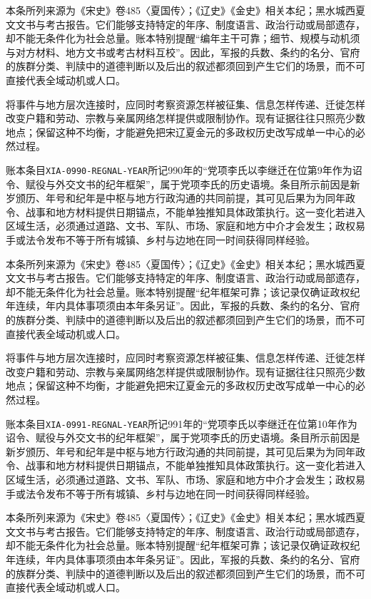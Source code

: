 本条所列来源为《宋史》卷485〈夏国传〉；《辽史》《金史》相关本纪；黑水城西夏文文书与考古报告。它们能够支持特定的年序、制度语言、政治行动或局部遗存，却不能无条件化为社会总量。账本特别提醒“编年主干可靠；细节、规模与动机须与对方材料、地方文书或考古材料互校”。因此，军报的兵数、条约的名分、官府的族群分类、判牍中的道德判断以及后出的叙述都须回到产生它们的场景，而不可直接代表全域动机或人口。

将事件与地方层次连接时，应同时考察资源怎样被征集、信息怎样传递、迁徙怎样改变户籍和劳动、宗教与亲属网络怎样提供或限制协作。现有证据往往只照亮少数地点；保留这种不均衡，才能避免把宋辽夏金元的多政权历史改写成单一中心的必然过程。

账本条目\texttt{XIA-0990-REGNAL-YEAR}所记990年的“党项李氏以李继迁在位第9年作为诏令、赋役与外交文书的纪年框架”，属于党项李氏的历史语境。条目所示前因是新岁颁历、年号和纪年是中枢与地方行政沟通的共同前提，其可见后果为为同年政令、战事和地方材料提供日期锚点，不能单独推知具体政策执行。这一变化若进入区域生活，必须通过道路、文书、军队、市场、家庭和地方中介才会发生；政权易手或法令发布不等于所有城镇、乡村与边地在同一时间获得同样经验。

本条所列来源为《宋史》卷485〈夏国传〉；《辽史》《金史》相关本纪；黑水城西夏文文书与考古报告。它们能够支持特定的年序、制度语言、政治行动或局部遗存，却不能无条件化为社会总量。账本特别提醒“纪年框架可靠；该记录仅确证政权纪年连续，年内具体事项须由本年条另证”。因此，军报的兵数、条约的名分、官府的族群分类、判牍中的道德判断以及后出的叙述都须回到产生它们的场景，而不可直接代表全域动机或人口。

将事件与地方层次连接时，应同时考察资源怎样被征集、信息怎样传递、迁徙怎样改变户籍和劳动、宗教与亲属网络怎样提供或限制协作。现有证据往往只照亮少数地点；保留这种不均衡，才能避免把宋辽夏金元的多政权历史改写成单一中心的必然过程。

账本条目\texttt{XIA-0991-REGNAL-YEAR}所记991年的“党项李氏以李继迁在位第10年作为诏令、赋役与外交文书的纪年框架”，属于党项李氏的历史语境。条目所示前因是新岁颁历、年号和纪年是中枢与地方行政沟通的共同前提，其可见后果为为同年政令、战事和地方材料提供日期锚点，不能单独推知具体政策执行。这一变化若进入区域生活，必须通过道路、文书、军队、市场、家庭和地方中介才会发生；政权易手或法令发布不等于所有城镇、乡村与边地在同一时间获得同样经验。

本条所列来源为《宋史》卷485〈夏国传〉；《辽史》《金史》相关本纪；黑水城西夏文文书与考古报告。它们能够支持特定的年序、制度语言、政治行动或局部遗存，却不能无条件化为社会总量。账本特别提醒“纪年框架可靠；该记录仅确证政权纪年连续，年内具体事项须由本年条另证”。因此，军报的兵数、条约的名分、官府的族群分类、判牍中的道德判断以及后出的叙述都须回到产生它们的场景，而不可直接代表全域动机或人口。

